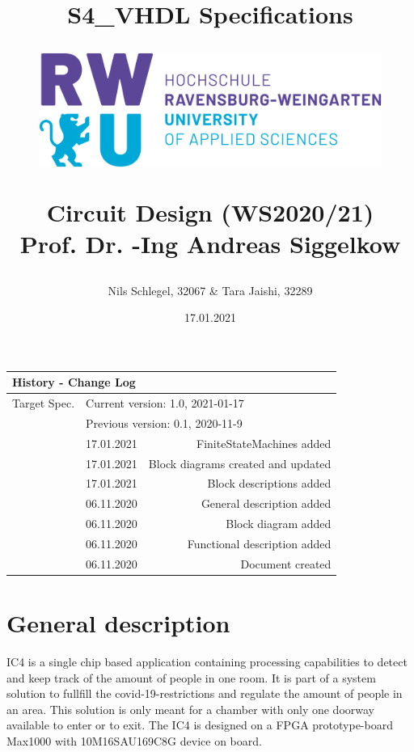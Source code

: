 \documentclass[12pt,a4 paper] {report}
\title{
	\textbf{S4\_VHDL Specifications} \\
	\begin{figure}[h]
		\centering
		\includegraphics[scale=0.4]{../png/rwu.png}
	\end{figure}
	Circuit Design (WS2020/21) \\
	Prof. Dr. -Ing Andreas Siggelkow \\
}
\author{Nils Schlegel, 32067 \& Tara Jaishi, 32289}
\date{17.01.2021}
\begin{document}
\maketitle

\newpage

\begin{center}
	\begin{tabular}{llr}
		\multicolumn{3}{l}{\textbf{History - Change Log}} \\
		\hline
		Target Spec. & \multicolumn{2}{l}{Current version: 1.0, 2021-01-17} \\
		& \multicolumn{2}{l}{Previous version: 0.1, 2020-11-9} \\
		\hline
		&	17.01.2021 & FiniteStateMachines added \\
		&	17.01.2021 & Block diagrams created and updated \\
		&	17.01.2021 & Block descriptions added \\
		&	06.11.2020 & General description added \\
		&	06.11.2020 & Block diagram added \\
		&	06.11.2020 & Functional description added \\
		&	06.11.2020 & Document created
	\end{tabular}
\end{center}

\newpage

\tableofcontents

\newpage

\chapter{General description}
IC4 is a single chip based application containing processing capabilities to detect and keep track of the amount of people in one room. It is part of a system solution to fullfill the covid-19-restrictions and regulate the amount of people in an area. This solution is only meant for a chamber with only one doorway available to enter or to exit.\newline
The IC4 is designed on a FPGA prototype-board Max1000 with 10M16SAU169C8G device on board.

\newpage
\end{document}
